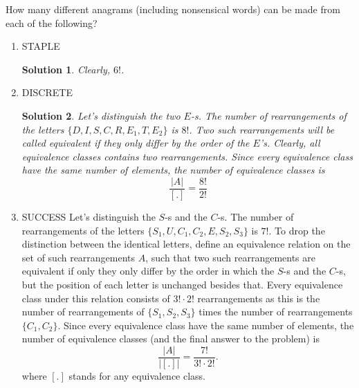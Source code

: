 \documentclass[11pt]{preprint}
\def\enumb{\begin{enumerate}}
\def\enume{\end{enumerate}}
\newtheorem*{solution}{Solution}
\begin{document}
\item How many different anagrams (including nonsensical words) can be made from each of the following?
\enumb
\item STAPLE
\begin{solution}
Clearly, $6!$.
\end{solution}
\item DISCRETE
\begin{solution}
Let's distinguish the two $E$-s. The number of rearrangements of the letters $\{D,I,S,C,R,E_1,T,E_2\}$ is $8!$. Two such rearrangements will be called equivalent if they only differ by the order of the $E$'s. Clearly, all equivalence classes contains two rearrangements. Since every equivalence class have the same number of elements, the number of equivalence classes is
\[
\frac{|A|}{[.]}=\frac{8!}{2!}
\]
\end{solution}
\item SUCCESS
Let's distinguish the $S$-s and the $C$-s. The number of rearrangements of the letters $\{S_1,U,C_1,C_2,E,S_2,S_3\}$ is $7!$. To drop the distinction between the identical letters, define an equivalence relation on the set of such rearrangements $A$, such that two such rearrangements are equivalent if only they only differ by the order in which the $S$-s and the $C$-s, but the position of each letter is unchanged besides that. Every equivalence class under this relation consists of $3!\cdot 2!$ rearrangements as this is the number of rearrangements of $\{S_1,S_2,S_3\}$ times the number of rearrangements $\{C_1,C_2\}$. Since every equivalence class have the same number of elements, the number of equivalence classes (and the final answer to the problem) is
\[
\frac{|A|}{|[.]|}=\frac{7!}{3!\cdot 2!}.
\] 
where $[.]$ stands for any equivalence class.
\enume
\end{document}
